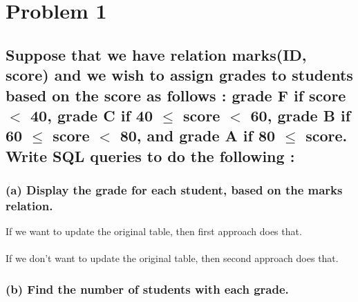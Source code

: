 \documentclass[12pt]{article}
\begin{document}
\begin{titlingpage}
\maketitle
\end{titlingpage}

\newpage

\section{Problem 1}

\subsection*{Suppose that we have relation marks(ID, score) and we wish to assign grades to students based on the score as follows : grade F if score $<$ 40, grade C if 40 $\leq$ score $<$ 60, grade B if 60 $\leq$ score $<$ 80, and grade A if 80 $\leq$ score. Write SQL queries to do the following :}

\subsubsection*{(a) Display the grade for each student, based on the marks relation.}

If we want to update the original table, then first approach does that. 
\vspace{5mm} \\
\vspace{5mm} \\
If we don't want to update the original table, then second approach does that. 
\vspace{5mm} \\
\subsubsection*{(b) Find the number of students with each grade.}

\end{document}
